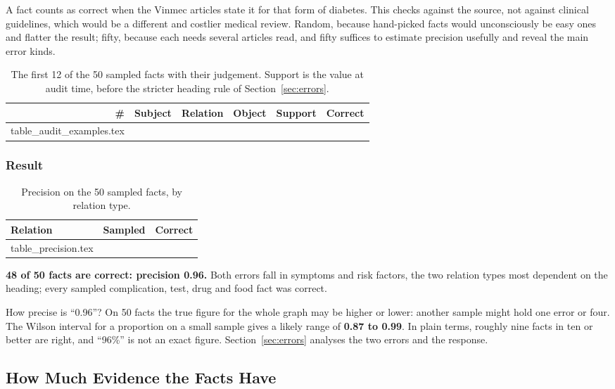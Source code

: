 \documentclass[11pt, a4paper]{article}
\makeatletter
\newcommand{\tabinput}[1]{\@@input #1 }   %
\makeatother
\begin{document}
A fact counts as correct when the Vinmec articles state it for that form of diabetes. This checks against the source, not against clinical guidelines, which would be a different and costlier medical review. Random, because hand-picked facts would unconsciously be easy ones and flatter the result; fifty, because each needs several articles read, and fifty suffices to estimate precision usefully and reveal the main error kinds.

\begin{table}[H]
\centering
\small
\caption{The first 12 of the 50 sampled facts with their judgement. Support is the value at audit time, before the stricter heading rule of Section~\ref{sec:errors}.}
\label{tab:audit}
\begin{tabular}{r l l l r l}
\toprule
\# & Subject & Relation & Object & Support & Correct \\
\midrule
\tabinput{table_audit_examples.tex}
\bottomrule
\end{tabular}
\end{table}

\subsubsection{Result}

\begin{table}[H]
\centering
\small
\caption{Precision on the 50 sampled facts, by relation type.}
\label{tab:precision}
\begin{tabular}{l r r}
\toprule
Relation & Sampled & Correct \\
\midrule
\tabinput{table_precision.tex}
\bottomrule
\end{tabular}
\end{table}

\textbf{48 of 50 facts are correct: precision 0.96.} Both errors fall in symptoms and risk factors, the two relation types most dependent on the heading; every sampled complication, test, drug and food fact was correct.

How precise is ``0.96''? On 50 facts the true figure for the whole graph may be higher or lower: another sample might hold one error or four. The Wilson interval for a proportion on a small sample gives a likely range of \textbf{0.87 to 0.99}. In plain terms, roughly nine facts in ten or better are right, and ``96\%'' is not an exact figure. Section~\ref{sec:errors} analyses the two errors and the response.

\subsection{How Much Evidence the Facts Have}
\end{document}
